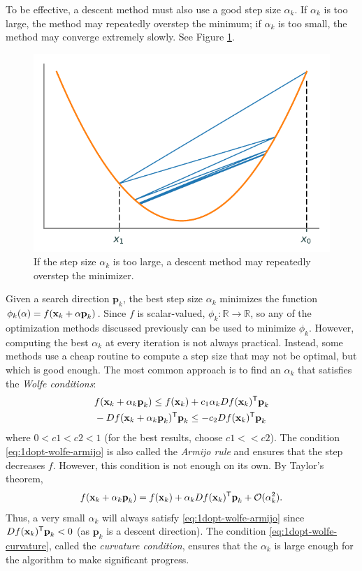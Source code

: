 To be effective, a descent method must also use a good step size $\alpha_k$.
If $\alpha_k$  is too large, the method may repeatedly overstep the minimum; if $\alpha_k$ is too small, the method may converge extremely slowly.
See Figure \ref{fig:1dopt-overstep}.

\begin{figure}[H]
    \centering
    \includegraphics[width=.7\textwidth]{figures/large_alpha.pdf}
    \caption{If the step size $\alpha_k$ is too large, a descent method may repeatedly overstep the minimizer.}
    \label{fig:1dopt-overstep}
\end{figure}

Given a search direction $\textbf{p}_k$, the best step size $\alpha_k$ minimizes the function $\phi_k(\alpha) = f(\mathbf{x}_k + \alpha\textbf{p}_k)$.
Since $f$ is scalar-valued, $\phi_k:\mathbb{R}\rightarrow\mathbb{R}$, so any of the optimization methods discussed previously can be used to minimize $\phi_k$.
However, computing the best $\alpha_k$ at every iteration is not always practical.
Instead, some methods use a cheap routine to compute a step size that may not be optimal, but which is good enough.
The most common approach is to find an $\alpha_k$ that satisfies the \emph{Wolfe conditions}:
\begin{align}
&f(\textbf{x}_k + \alpha_k \textbf{p}_k) \leq f(\textbf{x}_k) + c_1\alpha_k Df(\textbf{x}_k)^{\mathsf T} \textbf{p}_k
\label{eq:1dopt-wolfe-armijo}
\\
& - Df(\textbf{x}_k + \alpha_k \textbf{p}_k)^{\mathsf T} \textbf{p}_k \leq -c_2 Df(\textbf{x}_k)^{\mathsf T} \textbf{p}_k
\label{eq:1dopt-wolfe-curvature}
\end{align}
where $0 < c1 < c2 < 1$ (for the  best results, choose $c1 << c2$).
The condition \eqref{eq:1dopt-wolfe-armijo} is also called the \emph{Armijo rule} and ensures that the step decreases $f$.
However, this condition is not enough on its own.
By Taylor's theorem,
\[
f(\textbf{x}_k + \alpha_k \textbf{p}_k) = f(\textbf{x}_k) + \alpha_k Df(\textbf{x}_k)^{\mathsf T} \textbf{p}_k + \mathcal{O}(\alpha_k^2).
\]
Thus, a very small $\alpha_k$ will always satisfy \eqref{eq:1dopt-wolfe-armijo} since $Df(\textbf{x}_k)^{\mathsf T}\textbf{p}_k < 0$ (as $\textbf{p}_k$ is a descent direction).
The condition \eqref{eq:1dopt-wolfe-curvature}, called the \emph{curvature condition}, ensures that the $\alpha_k$ is large enough for the algorithm to make significant progress.

